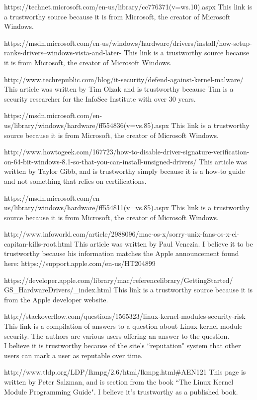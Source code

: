 \documentclass[11pt]{article}
\begin{document}
\begin{thebibliography}{9}
https://technet.microsoft.com/en-us/library/cc776371(v=ws.10).aspx
This link is a trustworthy source because it is from Microsoft, the creator of Microsoft Windows.

https://msdn.microsoft.com/en-us/windows/hardware/drivers/install/how-setup-ranks-drivers--windows-vista-and-later-
This link is a trustworthy source because it is from Microsoft, the creator of Microsoft Windows.

http://www.techrepublic.com/blog/it-security/defend-against-kernel-malware/
This article was written by Tim Olzak and is trustworthy because Tim is a security researcher for the InfoSec Institute with over 30 years.

https://msdn.microsoft.com/en-us/library/windows/hardware/ff554836(v=vs.85).aspx
This link is a trustworthy source because it is from Microsoft, the creator of Microsoft Windows.

http://www.howtogeek.com/167723/how-to-disable-driver-signature-verification-on-64-bit-windows-8.1-so-that-you-can-install-unsigned-drivers/
This article was written by Taylor Gibb, and is trustworthy simply because it is a how-to guide and not something that relies on certifications.

https://msdn.microsoft.com/en-us/library/windows/hardware/ff554811(v=vs.85).aspx
This link is a trustworthy source because it is from Microsoft, the creator of Microsoft Windows.

http://www.infoworld.com/article/2988096/mac-os-x/sorry-unix-fans-os-x-el-capitan-kills-root.html
This article was written by Paul Venezia. I believe it to be trustworthy because his information matches the Apple announcement found here: https://support.apple.com/en-us/HT204899

https://developer.apple.com/library/mac/referencelibrary/GettingStarted/\\GS\_HardwareDrivers/\_index.html
This link is a trustworthy source because it is from the Apple developer website.

http://stackoverflow.com/questions/1565323/linux-kernel-modules-security-risk
This link is a compilation of answers to a question about Linux kernel module security. The authors are various users offering an answer to the question.\\
I believe it is trustworthy because of the site's ``reputation" system that other users can mark a user as reputable over time.

http://www.tldp.org/LDP/lkmpg/2.6/html/lkmpg.html\#AEN121
This page is written by Peter Salzman, and is section from the book ``The Linux Kernel Module Programming Guide". I believe it's trustworthy as a published book.

\end{thebibliography}
\end{document}
